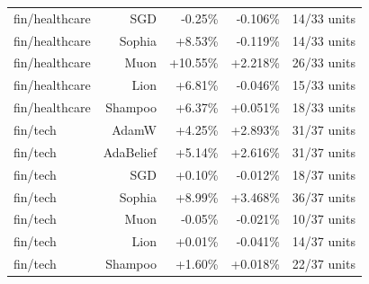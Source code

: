 \begin{table}[t]
\begin{tabular}{lrrrr}
fin/healthcare & SGD & -0.25\% & -0.106\% & 14/33 units \\
fin/healthcare & Sophia & +8.53\% & -0.119\% & 14/33 units \\
fin/healthcare & Muon & +10.55\% & +2.218\% & 26/33 units \\
fin/healthcare & Lion & +6.81\% & -0.046\% & 15/33 units \\
fin/healthcare & Shampoo & +6.37\% & +0.051\% & 18/33 units \\
fin/tech & AdamW & +4.25\% & +2.893\% & 31/37 units \\
fin/tech & AdaBelief & +5.14\% & +2.616\% & 31/37 units \\
fin/tech & SGD & +0.10\% & -0.012\% & 18/37 units \\
fin/tech & Sophia & +8.99\% & +3.468\% & 36/37 units \\
fin/tech & Muon & -0.05\% & -0.021\% & 10/37 units \\
fin/tech & Lion & +0.01\% & -0.041\% & 14/37 units \\
fin/tech & Shampoo & +1.60\% & +0.018\% & 22/37 units \\
\bottomrule
\end{tabular}
\end{table}
